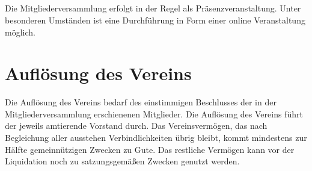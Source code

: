 	\subsection{} Die Mitgliederversammlung erfolgt in der Regel als Präsenzveranstaltung. Unter besonderen Umständen ist eine Durchführung in Form einer online Veranstaltung möglich.
	
\section{Auflösung des Vereins}	\label{11}
Die Auflösung des Vereins bedarf des einstimmigen Beschlusses der in der Mitgliederversammlung erschienenen Mitglieder.
Die Auflösung des Vereins führt der jeweils amtierende Vorstand durch. Das Vereinsvermögen, das nach Begleichung aller ausstehen Verbindlichkeiten übrig bleibt, kommt mindestens zur Hälfte gemeinnützigen Zwecken zu Gute. Das restliche Vermögen kann vor der Liquidation noch zu satzungsgemäßen Zwecken genutzt werden.
















